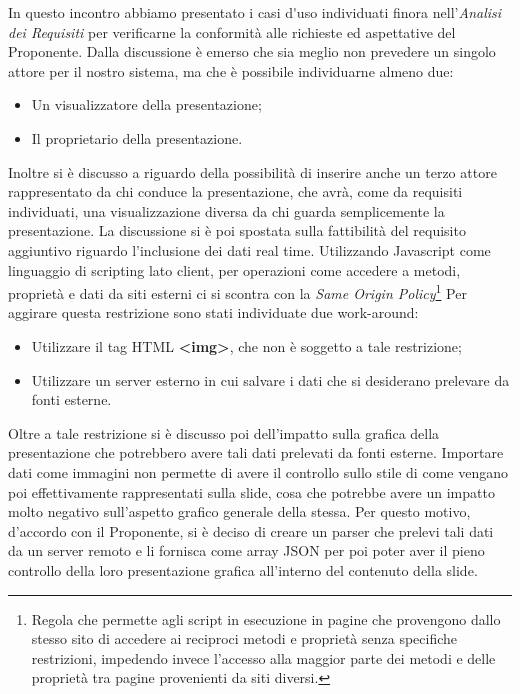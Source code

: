 In questo incontro abbiamo presentato i \gls{casi d'uso} individuati finora nell'\textit{Analisi dei Requisiti} per verificarne la conformità alle richieste ed aspettative del Proponente.
\noindent Dalla discussione è emerso che sia meglio non prevedere un singolo attore per il nostro sistema, ma che è possibile individuarne almeno due:
\begin{itemize}
	\item Un visualizzatore della presentazione;
	\item Il proprietario della presentazione.
\end{itemize}
Inoltre si è discusso a riguardo della possibilità di inserire anche un terzo attore rappresentato da chi conduce la presentazione, che avrà, come da requisiti individuati, una visualizzazione diversa da chi guarda semplicemente la presentazione.
\noindent La discussione si è poi spostata sulla fattibilità del requisito aggiuntivo riguardo l'inclusione dei dati \gls{real time}. Utilizzando \gls{Javascript} come linguaggio di scripting lato client, per operazioni come accedere a metodi, proprietà e dati da siti esterni ci si scontra con la \textit{Same Origin Policy}\footnote{Regola che permette agli script in esecuzione in pagine che provengono dallo stesso sito di accedere ai reciproci metodi e proprietà senza specifiche restrizioni, impedendo invece l'accesso alla maggior parte dei metodi e delle proprietà tra pagine provenienti da siti diversi.}
Per aggirare questa restrizione sono stati individuate due work-around:
\begin{itemize}
	\item Utilizzare il tag \gls{HTML} \textbf{<img>}, che non è soggetto a tale restrizione;
	\item Utilizzare un server esterno in cui salvare i dati che si desiderano prelevare da fonti esterne.
\end{itemize}   
Oltre a tale restrizione si è discusso poi dell'impatto sulla grafica della presentazione che potrebbero avere tali dati prelevati da fonti esterne. Importare dati come immagini non permette di avere il controllo sullo stile di come vengano poi effettivamente rappresentati sulla \gls{slide}, cosa che potrebbe avere un impatto molto negativo sull'aspetto grafico generale della stessa. Per questo motivo, d'accordo con il Proponente, si è deciso di creare un \gls{parser} che prelevi tali dati da un server remoto e li fornisca come array \gls{JSON} per poi poter aver il pieno controllo della loro presentazione grafica all'interno del contenuto della \gls{slide}.

